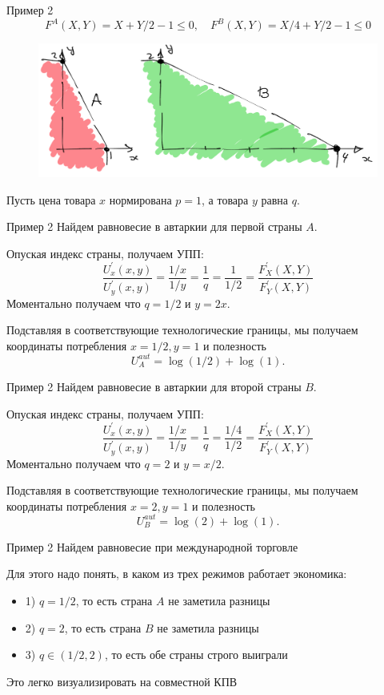 \documentclass{beamer}
\begin{document}
\begin{frame}{Пример 2}
$$ F^A(X,Y) = X + Y/2 - 1 \leqslant 0, \quad F^B(X,Y) = X/4 + Y/2 - 1 \leqslant 0$$
\begin{figure}[hbt]
\centering
\includegraphics[width=1 \textwidth]{pic2.png}
\end{figure}
Пусть цена товара $x$ нормирована $p=1$, а товара $y$ равна $q$.
\end{frame}

\begin{frame}{Пример 2}
Найдем равновесие в автаркии для первой страны $A$. 

Опуская индекс страны, получаем УПП:
$$ \frac{U^{'}_x(x,y)}{U^{'}_y(x,y)} = \frac{1/x}{1/y} = \frac{1}{q} = \frac{1}{1/2} = \frac{F^{'}_X(X,Y)}{F^{'}_Y(X,Y)}$$
Моментально получаем что $q = 1/2$ и $y = 2x$.

Подставляя в соответствующие технологические границы, мы получаем координаты потребления $x = 1/2, y = 1$ и полезность $$U^{aut}_A = \log(1/2) + \log(1).$$

\end{frame}

\begin{frame}{Пример 2}
Найдем равновесие в автаркии для второй страны $B$. 

Опуская индекс страны, получаем УПП:
$$ \frac{U^{'}_x(x,y)}{U^{'}_y(x,y)} = \frac{1/x}{1/y} = \frac{1}{q} = \frac{1/4}{1/2} = \frac{F^{'}_X(X,Y)}{F^{'}_Y(X,Y)}$$
Моментально получаем что $q = 2$ и $y = x/2$.

Подставляя в соответствующие технологические границы, мы получаем координаты потребления $x = 2, y = 1$ и полезность $$U^{aut}_B = \log(2) + \log(1).$$

\end{frame}

\begin{frame}{Пример 2}
Найдем равновесие при международной торговле

Для этого надо понять, в каком из трех режимов работает экономика:

\begin{itemize}
  \item 1) $q = 1/2$, то есть страна $A$ не заметила разницы
  \item 2) $q = 2$, то есть страна $B$ не заметила разницы 
  \item 3) $q \in (1/2,2)$, то есть обе страны строго выиграли
\end{itemize}
Это легко визуализировать на совместной КПВ
\end{frame}
\end{document}
